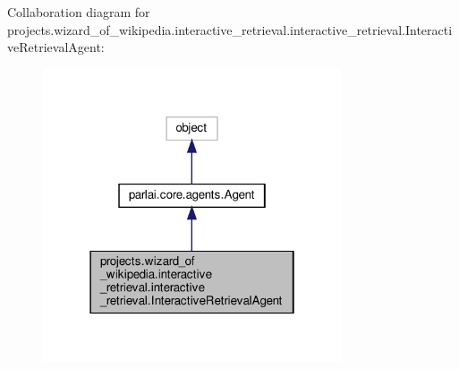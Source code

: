 Collaboration diagram for projects.\+wizard\+\_\+of\+\_\+wikipedia.\+interactive\+\_\+retrieval.\+interactive\+\_\+retrieval.\+Interactive\+Retrieval\+Agent\+:
\nopagebreak
\begin{figure}[H]
\begin{center}
\leavevmode
\includegraphics[width=250pt]{df/d9a/classprojects_1_1wizard__of__wikipedia_1_1interactive__retrieval_1_1interactive__retrieval_1_1In6e03392574af0d88610392e9d03e2b03}
\end{center}
\end{figure}
